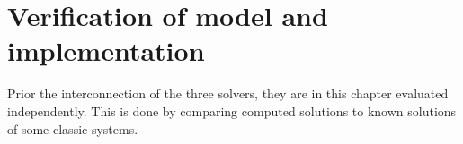 \chapter{Verification of model and implementation}
Prior the interconnection of the three solvers, they are in this
chapter evaluated independently. This is done by comparing computed
solutions to known solutions of some classic systems. 










